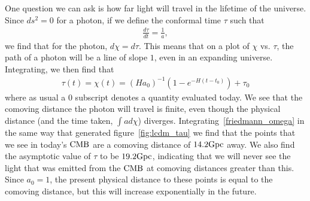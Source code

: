     One question we can ask is how far light will travel in the lifetime of the universe.
    Since $ds^2=0$ for a photon, if we define the conformal time $\tau$ such that
    \begin{align}\label{conformal_time_defn}
        \frac{d\tau}{dt} = \frac{1}{a},
    \end{align}
    we find that for the photon, $d\chi=d\tau$.
    This means that on a plot of $\chi$ vs. $\tau$, the path of a photon
    will be a line of slope $1$, even in an expanding universe.
    Integrating, we then find that
    \begin{align}
        \tau(t)=\chi(t)=(Ha_0)^{-1}\left(1-e^{-H(t-t_0)}\right)+\tau_0
    \end{align}
    where as usual a $0$ subscript denotes a quantity evaluated today.
    We see that the comoving distance the photon will travel is finite, even though the physical
    distance (and the time taken, $\int a d\chi$) diverges.
    Integrating~\eqref{friedmann_omega} in the same way that generated figure~\ref{fig:lcdm_tau}
    we find that the points that we see in today's $\text{CMB}$ are a comoving distance of $14.2\text{Gpc}$ away.
    We also find the asymptotic value of $\tau$ to be $19.2\text{Gpc}$, indicating that we will never see the
    light that was emitted from the $\text{CMB}$ at comoving distances greater than this.
    Since $a_0=1$, the present physical distance to these points is equal to the comoving distance,
    but this will increase exponentially in the future.

